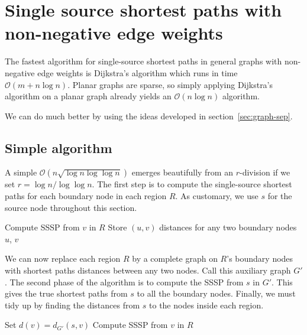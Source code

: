 \documentclass[11pt]{article}
\begin{document}
\section{Single source shortest paths with non-negative edge weights}
\label{sec:nonn-edge-weights}

The fastest algorithm for single-source shortest paths in general graphs with non-negative edge weights is Dijkstra's algorithm which runs in time $\mathcal{O}(m + n\log n)$. Planar graphs are sparse, so simply applying Dijkstra's algorithm on a planar graph already yields an $\mathcal{O}(n \log n)$ algorithm.

We can do much better by using the ideas developed in section~\ref{sec:graph-sep}.

\subsection{Simple algorithm}
\label{sec:simple-algorithm}

A simple $\mathcal{O}(n\sqrt{\log n \log \log n})$ emerges beautifully from an $r$-division if we set $r = \log n/\log \log n$. The first step is to compute the single-source shortest paths for each boundary node in each region $R$. As customary, we use $s$ for the source node throughout this section.

\begin{algorithm}[!htb]
  \label{alg:sssp-region}
  \begin{algorithmic}
        \State Compute SSSP from $v$ in $R$
        \State Store $(u,v)$ distances for any two boundary nodes $u$, $v$
      \EndFor
    \EndFor
  \end{algorithmic}
\end{algorithm}

 We can now replace each region $R$ by a complete graph on $R$'s boundary nodes with shortest paths distances between any two nodes. Call this auxiliary graph $G'$. The second phase of the algorithm is to compute the SSSP from $s$ in $G'$. This gives the true shortest paths from $s$ to all the boundary nodes. Finally, we must tidy up by finding the distances from $s$ to the nodes inside each region.

\begin{algorithm}[!htb]
  \label{alg:sssp-full}
  \begin{algorithmic}
        \State Set $d(v) = d_{G'}(s,v)$
        \State Compute SSSP from $v$ in $R$
      \EndFor
    \EndFor
  \end{algorithmic}
\end{algorithm}
\end{document}
